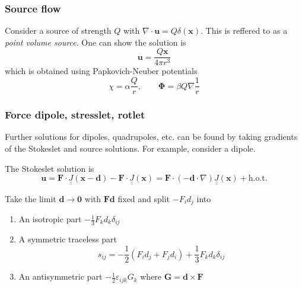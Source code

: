 \documentclass{jknotes}
\newcommand{\dunder}[1]{\underline{\underline{#1}}}
\newcommand{\x}{\bm{x}}
\newcommand{\inv}[1]{\frac{1}{#1}}
\begin{document}
\subsubsection{Source flow}
Consider a source of strength $Q$ with $\nabla \cdot \bm{u} = Q \delta(\x)$.
This is reffered to as a \emph{point volume source}. One can show the solution
is
\begin{equation}
	\bm{u} = \frac{Q\x}{4\pi r^3}
\end{equation}
which is obtained using Papkovich-Neuber potentials
\begin{equation}
	\chi = \alpha \frac{Q}{r}, \hspace{2em} \bm{\Phi} = \beta Q \nabla \inv{r}
\end{equation}

\subsubsection{Force dipole, stresslet, rotlet}
Further solutions for dipoles, quadrupoles, etc. can be found by taking
gradients of the Stokeslet and source solutions. For example, consider a
dipole.

\begin{center}
\end{center}

The Stokeslet solution is
\begin{equation}
	\bm{u} = \bm{F}\cdot\dunder{J} (\x-\bm{d}) - \bm{F} \cdot \dunder{J}(\x) =
	\bm{F} \cdot (-\bm{d}\cdot\nabla)\dunder{J}(\x) + \text{h.o.t.}
\end{equation}

Take the limit $\bm{d} \to \bm{0}$ with $\bm{F}\bm{d}$ fixed and split $-F_i
d_j$ into
\begin{enumerate}
	\item An isotropic part $-\frac{1}{3} F_k d_k \delta_{ij}$
	\item A symmetric traceless part
		\begin{equation}
			s_{ij} = -\frac{1}{2} (F_i d_j + F_j d_i) + \frac{1}{3} F_k d_k
			\delta_{ij}
		\end{equation}
	\item An antisymmetric part $-\frac{1}{2}\varepsilon_{ijk} G_k$ where
		$\bm{G} = \bm{d} \times \bm{F}$
\end{enumerate}
\end{document}
